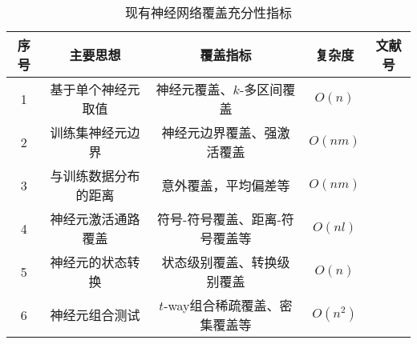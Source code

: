 \begin{table}[htp]
	\renewcommand\arraystretch{1.5}
	\small
	\centering
	\caption{现有神经网络覆盖充分性指标}
	\label{tab:coverage_criteria}
	\begin{tabular}{ccccc}
		\toprule
		\textbf{序号} & \textbf{主要思想} & \textbf{覆盖指标}       & \textbf{复杂度} & \textbf{文献号}                                                  \\
		\midrule
		1             & 基于单个神经元取值  & 神经元覆盖、$k$-多区间覆盖                    & $O(n)$          & \cite{ma2018deepgauge}\cite{Pei2019DeepXplore} \\
		2             & 训练集神经元边界  & 神经元边界覆盖、强激活覆盖                    & $O(nm)$          & \cite{ma2018deepgauge}                                           \\
		3             & 与训练数据分布的距离  & 意外覆盖，平均偏差等                & $O(nm)$         & \cite{Kim2019Guiding}\cite{Tian2019Testing}            \\
		4             & 神经元激活通路覆盖    & 符号-符号覆盖、距离-符号覆盖等 & $O(nl)$ & \cite{Wang2019DeepPath}\cite{Sun2018Testing} \\
		5             & 神经元的状态转换        & 状态级别覆盖、转换级别覆盖                         & $O(n)$          & \cite{Du2018DeepCruiser}                                         \\
		6             & 神经元组合测试    & $t$-way组合稀疏覆盖、密集覆盖等 & $O(n^2)$ & \cite{ma2019deepct} \\
		\bottomrule
	\end{tabular}
\end{table}








